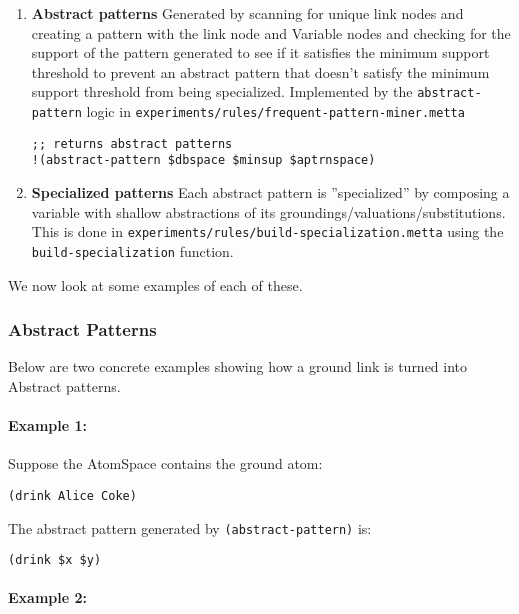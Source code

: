\documentclass{article}
\begin{document}
\begin{enumerate}
  \item \textbf{Abstract patterns}
  Generated by scanning for unique link nodes and creating a pattern with the link node and Variable nodes and checking for the support of the pattern generated to see if it satisfies the minimum support threshold to prevent an abstract pattern that doesn't satisfy the minimum support threshold from being specialized.  Implemented by the \texttt{abstract-pattern} logic in \texttt{experiments/rules/frequent-pattern-miner.metta}
    \begin{verbatim}
;; returns abstract patterns
!(abstract-pattern $dbspace $minsup $aptrnspace)
    \end{verbatim}
  \item \textbf{Specialized patterns}
    Each abstract pattern is ''specialized'' by composing a variable with shallow abstractions of its groundings/valuations/substitutions.  This is done in \texttt{experiments/rules/build-specialization.metta} using the \texttt{build-specialization} function.
\end{enumerate}

We now look at some examples of each of these.

\subsubsection{Abstract Patterns}

Below are two concrete examples showing how a ground link is turned into Abstract patterns.

\paragraph{Example 1:}

Suppose the AtomSpace contains the ground atom:

\begin{verbatim}
(drink Alice Coke)
\end{verbatim}

The abstract pattern generated by \texttt{(abstract-pattern)} is:

\begin{verbatim}
(drink $x $y)
\end{verbatim}

\paragraph{Example 2:}
\end{document}
